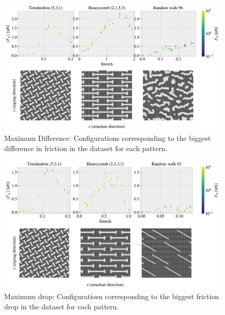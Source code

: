\begin{figure}[H]
  \centering
  \includegraphics[width=\linewidth]{figures/stretch_profiles/PP_max_diff.pdf}
  \caption{Maximum Difference: Configurations corresponding to the biggest difference in friction in the dataset for each pattern.}
  \label{fig:PP_max_diff}
\end{figure}  

\begin{figure}[H]
  \centering
  \includegraphics[width=\linewidth]{figures/stretch_profiles/PP_max_drop.pdf}
  \caption{Maximum drop: Configuratiosn corresponding to the biggest friction drop in the dataset for each pattern.}
  \label{fig:PP_max_drop}
\end{figure}  





